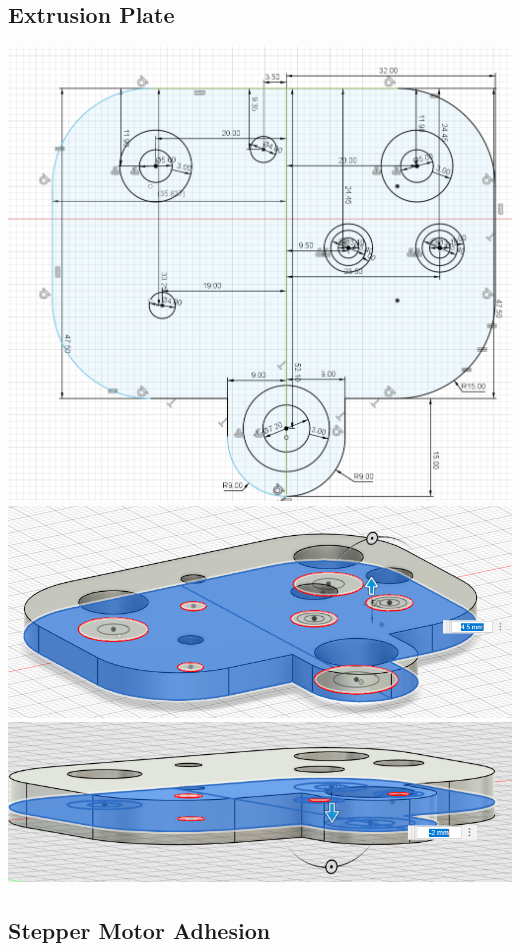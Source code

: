 \subsection{Extrusion Plate}

\includegraphics[width=\textwidth]{3dprints/extrusion_plate_3.png}
\includegraphics[width=\textwidth]{3dprints/extrusion_plate.png}
\includegraphics[width=\textwidth]{3dprints/extrusion_plate_2.png}

\subsection{Stepper Motor Adhesion}

